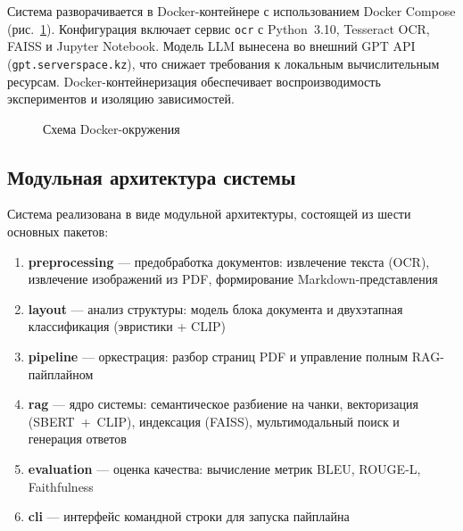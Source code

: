 \documentclass[a4paper,12pt]{article}
\begin{document}
Система разворачивается в Docker-контейнере с использованием Docker Compose (рис.~\ref{fig:docker-arch}). Конфигурация включает сервис \texttt{ocr} с Python~3.10, Tesseract OCR, FAISS и Jupyter Notebook. Модель LLM вынесена во внешний GPT API (\texttt{gpt.serverspace.kz}), что снижает требования к локальным вычислительным ресурсам. Docker-контейнеризация обеспечивает воспроизводимость экспериментов и изоляцию зависимостей.

\begin{figure}[H]
    \centering
    \caption{Схема Docker-окружения}
    \label{fig:docker-arch}
\end{figure}

\subsection{Модульная архитектура системы}

Система реализована в виде модульной архитектуры, состоящей из шести основных пакетов:

\begin{enumerate}
    \item \textbf{preprocessing} --- предобработка документов: извлечение текста (OCR), извлечение изображений из PDF, формирование Markdown-представления
    \item \textbf{layout} --- анализ структуры: модель блока документа и двухэтапная классификация (эвристики + CLIP)
    \item \textbf{pipeline} --- оркестрация: разбор страниц PDF и управление полным RAG-пайплайном
    \item \textbf{rag} --- ядро системы: семантическое разбиение на чанки, векторизация (SBERT~+~CLIP), индексация (FAISS), мультимодальный поиск и генерация ответов
    \item \textbf{evaluation} --- оценка качества: вычисление метрик BLEU, ROUGE-L, Faithfulness
    \item \textbf{cli} --- интерфейс командной строки для запуска пайплайна
\end{enumerate}
\end{document}
